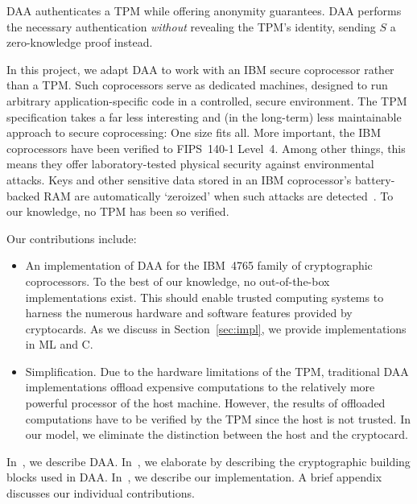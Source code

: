 DAA authenticates a TPM
while offering anonymity guarantees.
DAA performs the necessary authentication \emph{without} revealing the TPM's identity,
sending $S$ a zero-knowledge proof instead.

In this project, we adapt DAA to work with an IBM secure coprocessor
rather than a TPM.
Such coprocessors serve as dedicated machines, 
designed to run arbitrary application-specific
code in a controlled, secure environment.
The TPM specification takes a far less
interesting and (in the long-term) less maintainable approach to
secure coprocessing: One size fits all.
More important, the IBM coprocessors have been verified to FIPS~140-1 Level~4.
Among other things, this means they offer laboratory-tested physical security against
environmental attacks.
Keys and other sensitive data stored in an IBM coprocessor's battery-backed RAM
are automatically `zeroized' when such attacks are detected~\cite{smith:fips}.
To our knowledge, no TPM has been so verified.

Our contributions include:
\begin{itemize}
\item An implementation of DAA for the IBM~4765 family of cryptographic coprocessors.
To the best of our knowledge, no out-of-the-box implementations exist.
This should enable trusted computing systems to harness the numerous hardware and software features provided by cryptocards.
As we discuss in Section~\ref{sec:impl}, we provide implementations in ML and C.

\item Simplification.
Due to the hardware limitations of the TPM, traditional DAA implementations offload expensive computations to the relatively more powerful processor of the host machine.
However, the results of offloaded computations have to be verified by the TPM since the host is not trusted.
In our model, we eliminate the distinction between the host and the cryptocard. 
\end{itemize}

In~, we describe DAA.
In~, we elaborate by describing the
cryptographic building blocks used in DAA.
In~, we describe our implementation.
A brief appendix discusses our individual contributions.
